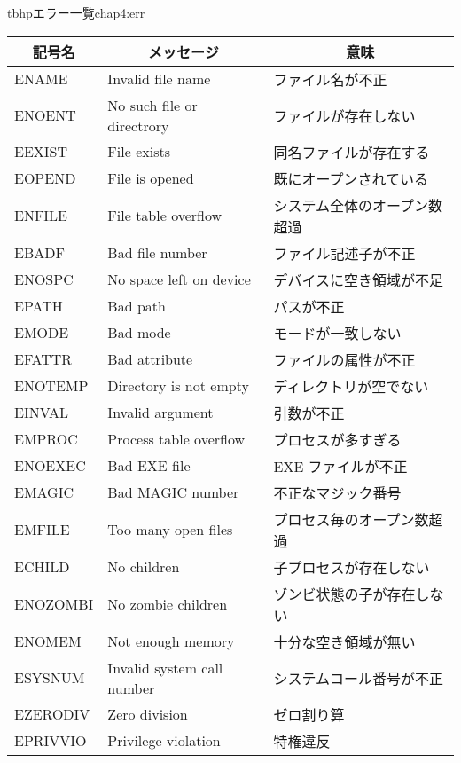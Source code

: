 \begin{mytable}{tbhp}{エラー一覧}{chap4:err}
\begin{tabular}{l|l|l}
\multicolumn{1}{c|}{記号名}
 & \multicolumn{1}{c|}{メッセージ}
 & \multicolumn{1}{c}{意味} \\\hline
ENAME     & Invalid file name           & ファイル名が不正 \\
ENOENT    & No such file or directrory  & ファイルが存在しない \\
EEXIST    & File exists                 & 同名ファイルが存在する \\
EOPEND    & File is opened              & 既にオープンされている \\
ENFILE    & File table overflow         & システム全体のオープン数超過 \\
EBADF     & Bad file number             & ファイル記述子が不正 \\
ENOSPC    & No space left on device     & デバイスに空き領域が不足 \\
EPATH     & Bad path                    & パスが不正 \\
EMODE     & Bad mode                    & モードが一致しない \\
EFATTR    & Bad attribute               & ファイルの属性が不正 \\
ENOTEMP   & Directory is not empty      & ディレクトリが空でない \\
EINVAL    & Invalid argument            & 引数が不正 \\
EMPROC    & Process table overflow      & プロセスが多すぎる \\
ENOEXEC   & Bad EXE file                & EXE ファイルが不正 \\
EMAGIC    & Bad MAGIC number            & 不正なマジック番号 \\
EMFILE    & Too many open files         & プロセス毎のオープン数超過 \\
ECHILD    & No children                 & 子プロセスが存在しない \\
ENOZOMBI  & No zombie children          & ゾンビ状態の子が存在しない \\
ENOMEM    & Not enough memory           & 十分な空き領域が無い \\
ESYSNUM   & Invalid system call number  & システムコール番号が不正 \\
EZERODIV  & Zero division               & ゼロ割り算 \\
EPRIVVIO  & Privilege violation         & 特権違反 \\

\end{tabular}
\end{mytable}
